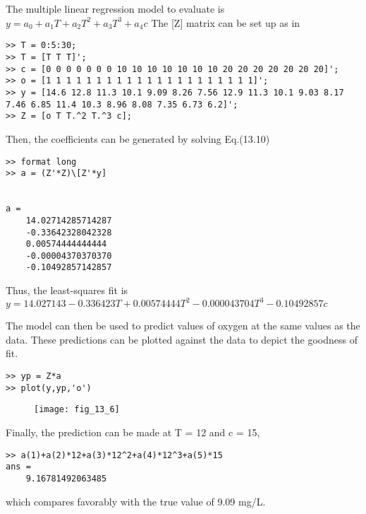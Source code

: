 \documentclass[../main.tex]{subfiles}
\begin{document}
\section{}
The multiple linear regression model to evaluate is
	\bigbreak
$y=a_{0}+a_{1} T+a_{2} T^{2}+a_{3} T^{3}+a_{4} c$
	\bigbreak
The [Z] matrix can be set up as in 
	\bigbreak
\begin{lstlisting}[numbers=none]
>> T = 0:5:30;
>> T = [T T T]';
>> c = [0 0 0 0 0 0 0 10 10 10 10 10 10 10 20 20 20 20 20 20 20]';
>> o = [1 1 1 1 1 1 1 1 1 1 1 1 1 1 1 1 1 1 1 1 1]';
>> y = [14.6 12.8 11.3 10.1 9.09 8.26 7.56 12.9 11.3 10.1 9.03 8.17
7.46 6.85 11.4 10.3 8.96 8.08 7.35 6.73 6.2]';
>> Z = [o T T.^2 T.^3 c];
\end{lstlisting}
	\bigbreak
Then, the coefficients can be generated by solving Eq.(13.10) 
	\bigbreak
\begin{lstlisting}[numbers=none]
>> format long
>> a = (Z'*Z)\[Z'*y]


a =
	14.02714285714287
	-0.33642328042328
	0.00574444444444
	-0.00004370370370
	-0.10492857142857
\end{lstlisting}
	\bigbreak
Thus, the least-squares fit is 
	\bigbreak
$y=14.027143-0.336423 T+0.00574444 T^{2}-0.000043704 T^{3}-0.10492857 c$
	\bigbreak
\begin{blockquote}
The model can then be used to predict values of oxygen at the same values as the data.
These predictions can be plotted against the data to depict the goodness of fit.
\end{blockquote}
	\bigbreak
\begin{lstlisting}[numbers=none]
>> yp = Z*a
>> plot(y,yp,'o') 
\end{lstlisting}
	\bigbreak
	\begin{figure}[H]
		\texttt{[image: fig\_13\_6]}
		\label{fig:fig_13_6}
	\end{figure}
	\bigbreak
Finally, the prediction can be made at T = 12 and c = 15, 
	\bigbreak
\begin{lstlisting}[numbers=none]
>> a(1)+a(2)*12+a(3)*12^2+a(4)*12^3+a(5)*15
ans =
	9.16781492063485 
\end{lstlisting}
	\bigbreak
which compares favorably with the true value of 9.09 mg/L. 
	\bigbreak
\end{document}
